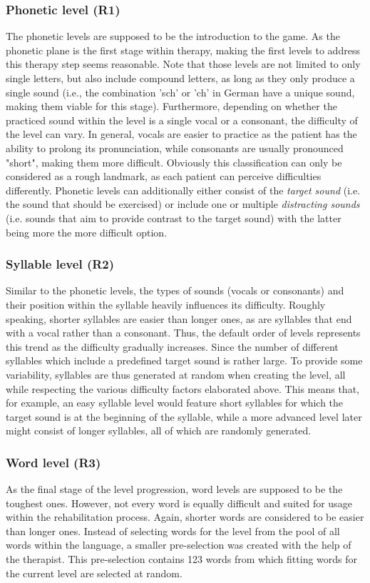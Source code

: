 \documentclass[draft,final]{vutinfth} %
\begin{document}
\subsubsection{Phonetic level (R1)}
The phonetic levels are supposed to be the introduction to the game. As the phonetic plane is the first stage within therapy, making the first levels to address this therapy step seems reasonable. Note that those levels are not limited to only single letters, but also include compound letters, as long as they only produce a single sound (i.e., the combination 'sch' or 'ch' in German have a unique sound, making them viable for this stage). Furthermore, depending on whether the practiced sound within the level is a single vocal or a consonant, the difficulty of the level can vary. In general, vocals are easier to practice as the patient has the ability to prolong its pronunciation, while consonants are usually pronounced "short", making them more difficult. Obviously this classification can only be considered as a rough landmark, as each patient can perceive difficulties differently. Phonetic levels can additionally either consist of the \emph{target sound} (i.e. the sound that should be exercised) or include one or multiple \emph{distracting sounds} (i.e. sounds that aim to provide contrast to the target sound) with the latter being more the more difficult option.

\subsubsection{Syllable level (R2)}
Similar to the phonetic levels, the types of sounds (vocals or consonants) and their position within the syllable heavily influences its difficulty. Roughly speaking, shorter syllables are easier than longer ones, as are syllables that end with a vocal rather than a consonant. Thus, the default order of levels represents this trend as the difficulty gradually increases. Since the number of different syllables which include a predefined target sound is rather large. To provide some variability, syllables are thus generated at random when creating the level, all while respecting the various difficulty factors elaborated above. This means that, for example, an easy syllable level would feature short syllables for which the target sound is at the beginning of the syllable, while a more advanced level later might consist of longer syllables, all of which are randomly generated.

\subsubsection{Word level (R3)}
As the final stage of the level progression, word levels are supposed to be the toughest ones. However, not every word is equally difficult and suited for usage within the rehabilitation process. Again, shorter words are considered to be easier than longer ones. Instead of selecting words for the level from the pool of all words within the language, a smaller pre-selection was created with the help of the therapist. This pre-selection contains 123 words from which fitting words for the current level are selected at random. \\
\end{document}
